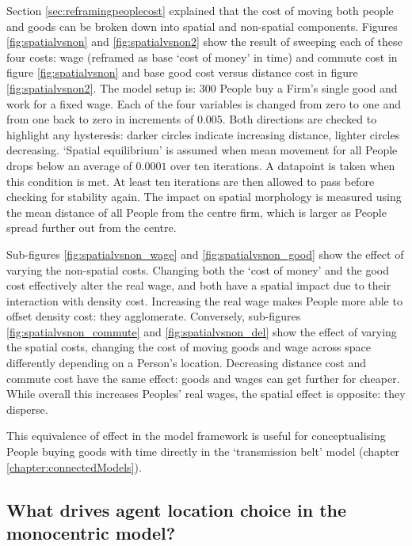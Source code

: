 Section \ref{sec:reframingpeoplecost} explained that the cost of moving both people and goods can be broken down into spatial and non-spatial components. Figures \ref{fig:spatialvsnon} and \ref{fig:spatialvsnon2} show the result of sweeping each of these four costs: wage (reframed as base `cost of money' in time) and commute cost in figure \ref{fig:spatialvsnon} and base good cost versus distance cost in figure \ref{fig:spatialvsnon2}. The model setup is: $300$ People buy a Firm's single good and work for a fixed wage. Each of the four variables is changed from zero to one and from one back to zero in increments of $0.005$. Both directions are checked to highlight any hysteresis: darker circles indicate increasing distance, lighter circles decreasing. `Spatial equilibrium' is assumed when mean movement for all People drops below an average of $0.0001$ over ten iterations. A datapoint is taken when this condition is met. At least ten iterations are then allowed to pass before checking for stability again. The impact on spatial morphology  is measured using the mean distance of all People from the centre firm, which is larger as People spread further out from the centre. 

Sub-figures \ref{fig:spatialvsnon_wage} and \ref{fig:spatialvsnon_good} show the effect of varying the non-spatial costs. Changing both the `cost of money' and the good cost effectively alter the real wage, and both have a spatial impact due to their interaction with density cost. Increasing the real wage makes People more able to offset density cost: they agglomerate. Conversely, sub-figures \ref{fig:spatialvsnon_commute} and \ref{fig:spatialvsnon_del} show the effect of varying the spatial costs, changing the cost of moving goods and wage across space differently depending on a Person's location. Decreasing distance cost and commute cost have the same effect: goods and wages can get further for cheaper. While overall this increases Peoples' real wages, the spatial effect is opposite: they disperse. 

This equivalence of effect in the model framework is useful for conceptualising People buying goods with time directly in the `transmission belt' model (chapter \ref{chapter:connectedModels}).

\subsection{What drives agent location choice in the monocentric model? \label{sec:rationalchoices}}

